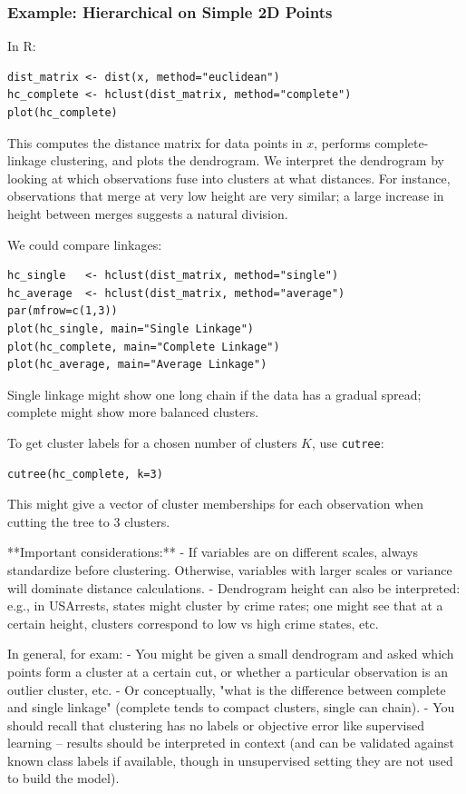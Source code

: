 \documentclass[11pt]{article}
\begin{document}
\subsubsection*{Example: Hierarchical on Simple 2D Points}
In R:
\begin{verbatim}
dist_matrix <- dist(x, method="euclidean")
hc_complete <- hclust(dist_matrix, method="complete")
plot(hc_complete)
\end{verbatim}
This computes the distance matrix for data points in $x$, performs complete-linkage clustering, and plots the dendrogram. We interpret the dendrogram by looking at which observations fuse into clusters at what distances. For instance, observations that merge at very low height are very similar; a large increase in height between merges suggests a natural division.

We could compare linkages:
\begin{verbatim}
hc_single   <- hclust(dist_matrix, method="single")
hc_average  <- hclust(dist_matrix, method="average")
par(mfrow=c(1,3))
plot(hc_single, main="Single Linkage")
plot(hc_complete, main="Complete Linkage")
plot(hc_average, main="Average Linkage")
\end{verbatim}
Single linkage might show one long chain if the data has a gradual spread; complete might show more balanced clusters.

To get cluster labels for a chosen number of clusters $K$, use \texttt{cutree}:
\begin{verbatim}
cutree(hc_complete, k=3)
\end{verbatim}
This might give a vector of cluster memberships for each observation when cutting the tree to 3 clusters.

**Important considerations:**
- If variables are on different scales, always standardize before clustering. Otherwise, variables with larger scales or variance will dominate distance calculations.
- Dendrogram height can also be interpreted: e.g., in USArrests, states might cluster by crime rates; one might see that at a certain height, clusters correspond to low vs high crime states, etc.

In general, for exam:
- You might be given a small dendrogram and asked which points form a cluster at a certain cut, or whether a particular observation is an outlier cluster, etc.
- Or conceptually, "what is the difference between complete and single linkage" (complete tends to compact clusters, single can chain).
- You should recall that clustering has no labels or objective error like supervised learning – results should be interpreted in context (and can be validated against known class labels if available, though in unsupervised setting they are not used to build the model).
\end{document}
